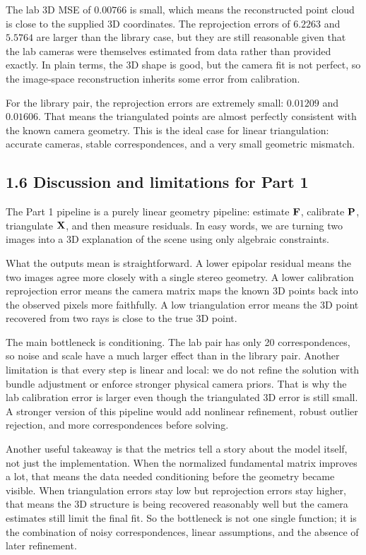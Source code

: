 {The lab 3D MSE of $0.00766$ is small, which means the reconstructed point cloud is close to the supplied 3D coordinates. The reprojection errors of $6.2263$ and $5.5764$ are larger than the library case, but they are still reasonable given that the lab cameras were themselves estimated from data rather than provided exactly. In plain terms, the 3D shape is good, but the camera fit is not perfect, so the image-space reconstruction inherits some error from calibration.

For the library pair, the reprojection errors are extremely small: $0.01209$ and $0.01606$. That means the triangulated points are almost perfectly consistent with the known camera geometry. This is the ideal case for linear triangulation: accurate cameras, stable correspondences, and a very small geometric mismatch.

\subsection*{1.6 Discussion and limitations for Part 1}
The Part 1 pipeline is a purely linear geometry pipeline: estimate $\mathbf{F}$, calibrate $\mathbf{P}$, triangulate $\mathbf{X}$, and then measure residuals. In easy words, we are turning two images into a 3D explanation of the scene using only algebraic constraints.

What the outputs mean is straightforward. A lower epipolar residual means the two images agree more closely with a single stereo geometry. A lower calibration reprojection error means the camera matrix maps the known 3D points back into the observed pixels more faithfully. A low triangulation error means the 3D point recovered from two rays is close to the true 3D point.

The main bottleneck is conditioning. The lab pair has only 20 correspondences, so noise and scale have a much larger effect than in the library pair. Another limitation is that every step is linear and local: we do not refine the solution with bundle adjustment or enforce stronger physical camera priors. That is why the lab calibration error is larger even though the triangulated 3D error is still small. A stronger version of this pipeline would add nonlinear refinement, robust outlier rejection, and more correspondences before solving.

Another useful takeaway is that the metrics tell a story about the model itself, not just the implementation. When the normalized fundamental matrix improves a lot, that means the data needed conditioning before the geometry became visible. When triangulation errors stay low but reprojection errors stay higher, that means the 3D structure is being recovered reasonably well but the camera estimates still limit the final fit. So the bottleneck is not one single function; it is the combination of noisy correspondences, linear assumptions, and the absence of later refinement.

}
